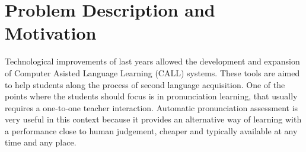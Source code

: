 
\section{Problem Description and Motivation} \label{section:motivation}

Technological improvements of last years allowed the development and expansion of Computer
Asisted Language Learning (CALL) systems. These tools are aimed to help students along the
process of second language acquisition. One of the points where the
students should focus is in pronunciation learning, that usually requires a one-to-one teacher
interaction. Automatic pronunciation assessment is very useful in this
context because it provides an alternative way of learning with a performance close to human judgement,
cheaper and typically available at any time and any place.




